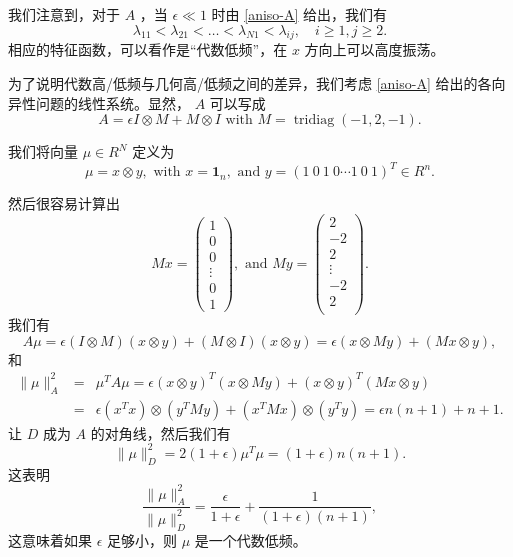 \documentclass[12pt]{acta_2011xz}
\begin{document}
   


 
 
 
 
   

我们注意到，对于    $A$    ，当    $\epsilon\ll 1$    时由    \eqref{aniso-A}    给出，我们有 
   $$
\lambda_{11}<\lambda_{21}< \ldots <\lambda_{N1}<\lambda_{ij}, \quad i\ge
1, j\ge 2.
$$    相应的特征函数，可以看作是“代数低频”，在    $x$    方向上可以高度振荡。  

为了说明代数高/低频与几何高/低频之间的差异，我们考虑    \eqref{aniso-A}    给出的各向异性问题的线性系统。显然，   $A$    可以写成
   \begin{equation*}
    A= \epsilon I\otimes M + M\otimes I \text{ with } M=\operatorname{tridiag}(-1, 2, -1).
\end{equation*}     

我们将向量    $\mu \in R^N$    定义为 
   \begin{equation*}
    \mu=x\otimes y, \text{ with } x=\bm{1}_n, \text{ and } y= (1~0~1~ 0\cdots 1~0~1)^T\in R^n.
\end{equation*}     

然后很容易计算出 
   \begin{equation*}
    Mx= \begin{pmatrix}
        1 \\ 
        0 \\ 
        0 \\ 
        \vdots \\ 
        0 \\ 
        1
    \end{pmatrix}, \text{ and }
    My= \begin{pmatrix}
        2 \\ 
        -2 \\ 
        2 \\ 
        \vdots \\ 
        -2 \\ 
        2 \\  
    \end{pmatrix}.
\end{equation*}    我们有 
   \begin{equation*}
  A\mu = \epsilon (I\otimes M)(x\otimes y)+(M\otimes I)(x\otimes y) = \epsilon (x\otimes My)+(Mx\otimes y),
\end{equation*}    和 
   \begin{eqnarray*}
    \|\mu\|_A^2 &= &\mu^TA\mu= \epsilon (x\otimes y)^T(x\otimes My)+(x\otimes y)^T(Mx\otimes y) \\ 
    &=& \epsilon (x^Tx)\otimes (y^TMy)+(x^TMx)\otimes (y^Ty)=\epsilon n(n+1)+n+1.
\end{eqnarray*}    让    $D$    成为    $A$    的对角线，然后我们有
   \begin{equation*}
    \|\mu\|_D^2 = 2(1+\epsilon)\mu^T\mu= (1+\epsilon)n(n+1).
\end{equation*}    这表明
   \begin{equation*}
    \frac{\|\mu\|_A^2}{\|\mu\|_D^2}= \frac{\epsilon}{1+\epsilon}+\frac{1}{(1+\epsilon)(n+1)},
\end{equation*}    这意味着如果    $\epsilon$    足够小，则    $\mu$    是一个代数低频。  
\end{document}
